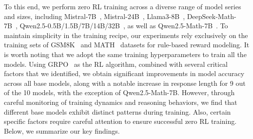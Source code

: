 To this end, we perform zero RL training across a diverse range of model series and sizes, including Mistral-7B~\citep{jiang2023mistral7b}, Mistral-24B~\citep{mistral2024small}, Llama3-8B~\citep{dubey2024llama}, DeepSeek-Math-7B~\citep{shao2024deepseekmath}, Qwen2.5-0.5B/1.5B/7B/14B/32B~\citep{yang2024qwen2}, as well as Qwen2.5-Math-7B~\citep{yang2024qwen2math}. 
To maintain simplicity in the training recipe, our experiments rely exclusively on the training sets of GSM8K~\citep{cobbe2021training} and MATH~\citep{hendrycks2021measuring} datasets for rule-based reward modeling.
It is worth noting that we adopt the same training hyperparameters to train all the models.
Using GRPO~\citep{shao2024deepseekmath} as the RL algorithm, combined with several critical factors that we identified, we obtain significant improvements in model accuracy across all base models, along with a notable increase in response length for 9 out of the 10 models, with the exception of Qwen2.5-Math-7B. 
However, through careful monitoring of training dynamics and reasoning behaviors, we find that different base models exhibit distinct patterns during training. Also, certain specific factors require careful attention to ensure successful zero RL training. Below, we summarize our key findings.
